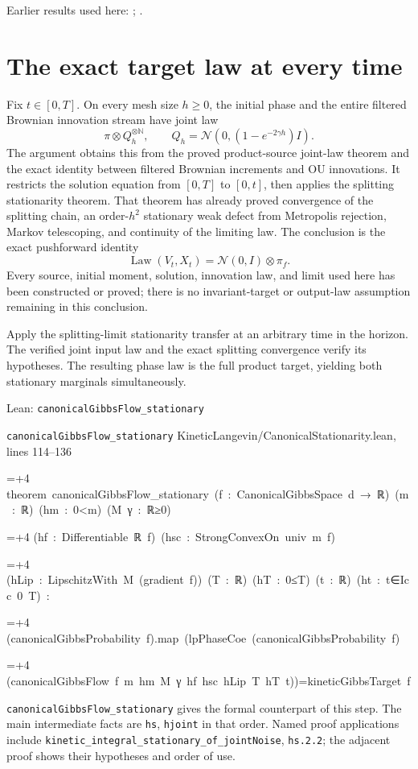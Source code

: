 \documentclass[11pt,a4paper]{article}
\newlength{\leancharwidth}
\newenvironment{leancode}{\par\smallskip\begingroup\ttfamily\footnotesize\raggedright
  \settowidth{\leancharwidth}{M}\setlength{\parskip}{0pt}\setlength{\parindent}{0pt}
  \frenchspacing}{\par\endgroup\smallskip}
\newcommand{\leanline}[2]{\hangindent=\dimexpr#1\leancharwidth+4\leancharwidth\relax
  \hangafter=1\noindent\hspace*{#1\leancharwidth}#2\par}
\newcommand{\leansource}[1]{\par{\footnotesize\color{leanmuted}#1}\par}
\newcommand{\leanlabel}[1]{\par\smallskip\noindent{\small\bfseries #1}\par}
\begin{document}
Earlier results used here: \cite[Section~3.13.2]{LangevinLean2026ULASC}; \cite[Section~3.13.5]{LangevinLean2026ULASC}.

\section{\texorpdfstring{The exact target law at every time}{The exact target law at every time}}


Fix \(t\in[0,T]\). On every mesh size \(h\ge0\), the initial phase and the entire filtered Brownian innovation stream have joint law \[\pi\otimes Q_h^{\otimes\mathbb N},\qquad Q_h=\mathcal N\!\left(0,(1-e^{-2\gamma h})I\right).\] The argument obtains this from the proved product-source joint-law theorem and the exact identity between filtered Brownian increments and OU innovations. It restricts the solution equation from \([0,T]\) to \([0,t]\), then applies the splitting stationarity theorem. That theorem has already proved convergence of the splitting chain, an order-\(h^2\) stationary weak defect from Metropolis rejection, Markov telescoping, and continuity of the limiting law. The conclusion is the exact pushforward identity \[\operatorname{Law}(V_t,X_t)=\mathcal N(0,I)\otimes\pi_f.\] Every source, initial moment, solution, innovation law, and limit used here has been constructed or proved; there is no invariant-target or output-law assumption remaining in this conclusion.



Apply the splitting-limit stationarity transfer at an arbitrary time in the horizon. The verified joint input law and the exact splitting convergence verify its hypotheses. The resulting phase law is the full product target, yielding both stationary marginals simultaneously.

\begin{leanbox}{Lean: \texttt{canonicalGibbsFlow\_\allowbreak{}stationary}}
\leansource{\texttt{canonicalGibbsFlow\_\allowbreak{}stationary} \quad KineticLangevin/\allowbreak{}CanonicalStationarity.lean, lines 114–136}
\begin{leancode}
\leanline{0}{theorem\ canonicalGibbsFlow\_stationary\ (f\ :\ CanonicalGibbsSpace\ d\ →\ ℝ)\ (m\ :\ ℝ)\ (hm\ :\ 0<m)\ (M\ γ\ :\ ℝ≥0)}
\leanline{4}{(hf\ :\ Differentiable\ ℝ\ f)\ (hsc\ :\ StrongConvexOn\ univ\ m\ f)}
\leanline{4}{(hLip\ :\ LipschitzWith\ M\ (gradient\ f))\ (T\ :\ ℝ)\ (hT\ :\ 0≤T)\ (t\ :\ ℝ)\ (ht\ :\ t∈Icc\ 0\ T)\ :}
\leanline{4}{(canonicalGibbsProbability\ f).map\ (lpPhaseCoe\ (canonicalGibbsProbability\ f)}
\leanline{6}{(canonicalGibbsFlow\ f\ m\ hm\ M\ γ\ hf\ hsc\ hLip\ T\ hT\ t))=kineticGibbsTarget\ f}
\end{leancode}
\leanlabel{How the Lean proof follows the argument}
\texttt{canonical\allowbreak{}Gibbs\allowbreak{}Flow\_\allowbreak{}stationary} gives the formal counterpart of this step. The main intermediate facts are \texttt{hs}, \texttt{hjoint} in that order. Named proof applications include \texttt{kinetic\_\allowbreak{}integral\_\allowbreak{}stationary\_\allowbreak{}of\_\allowbreak{}joint\allowbreak{}Noise}, \texttt{hs.\allowbreak{}2.\allowbreak{}2}; the adjacent proof shows their hypotheses and order of use.
\end{leanbox}
\end{document}
